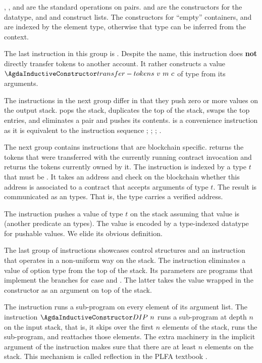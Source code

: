 , , and  are the standard operations on
pairs.  and  are the constructors for the
 datatype, and  and  construct
lists. The constructors for ``empty'' containers,  and
 are indexed by the element type, otherwise that type can be
inferred from the context.

The last instruction in this group is . Despite
the name, this instruction does \textbf{not} directly transfer tokens
to another account. It rather constructs a value
{$\AtransferTokens~v~m~c$} of type {\Aoperation} from its arguments.

The instructions in the next group differ in that they push zero or more
values on the output stack.  pops the stack,  duplicates the top of the
stack,  swaps the top entries, and  eliminates
a pair and pushes its contents.  is a convenience
instruction as it is equivalent to the instruction sequence
; ; ; . 

The next group contains instructions that are blockchain
specific.  returns the tokens that were transferred with
the currently running contract invocation and   returns
the tokens currently owned by it. The  instruction is
indexed by a type $t$ that must be {\APassable}. It takes an address
and check on the blockchain whether this address is associated to a
contract that accepts arguments of type $t$. The result is
communicated as an  types. That is, the {\Acontract} type
carries a verified address.

The  instruction pushes a value of type $t$ on the stack
assuming that value is {\APushable} (another predicate an types). The
value is encoded by a type-indexed datatype  for
pushable values. We elide its obvious definition.

The last group of instructions showcases control structures and an
instruction that operates in a non-uniform way on the stack. The
instruction  eliminates a value of option type from the
top of the stack. Its parameters are programs that implement the branches for case 
and . The latter takes the value wrapped in the 
constructor as an argument on top of the stack.

The instruction  runs a sub-program on every element of its
argument list. The instruction $\ACon{DIP}~n$ runs a sub-program at
depth $n$ on the input stack, that is, it skips over the first $n$
elements of the stack, runs the sub-program, and reattaches those
elements. The extra machinery in the implicit argument of the
instruction makes sure that there are at least $n$ elements on the
stack. This mechanism is called reflection in the  PLFA textbook
\cite{plfa}.

